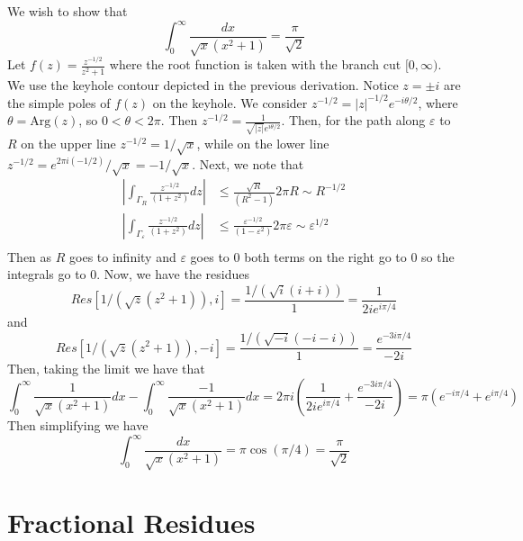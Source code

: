 \begin{example}
    We wish to show that $$\int_0^{\infty}\frac{dx}{\sqrt{x}(x^2+1)} = \frac{\pi}{\sqrt{2}}$$
    Let $f(z) = \frac{z^{-1/2}}{z^2+1}$ where the root function is taken with the branch cut $[0,\infty)$. We use the keyhole contour depicted in the previous derivation. Notice $z = \pm i$ are the simple poles of $f(z)$ on the keyhole. We consider $z^{-1/2} = |z|^{-1/2}e^{-i\theta/2}$, where $\theta = \text{Arg}(z)$, so $0 < \theta < 2\pi$. Then $z^{-1/2} = \frac{1}{\sqrt{|z|}e^{i\theta/2}}$. Then, for the path along $\varepsilon$ to $R$ on the upper line $z^{-1/2} = 1/\sqrt{x}$, while on the lower line $z^{-1/2} = e^{2\pi i(-1/2)}/\sqrt{x} = -1/\sqrt{x}$. Next, we note that \begin{align*}
        \left|\int_{\Gamma_R}\frac{z^{-1/2}}{(1+z^2)}dz\right| &\leq \frac{\sqrt{R}}{(R^2-1)}2\pi R\sim R^{-1/2} \\
        \left|\int_{\Gamma_{\varepsilon}}\frac{z^{-1/2}}{(1+z^2)}dz\right| &\leq \frac{\varepsilon^{-1/2}}{(1-\varepsilon^2)}2\pi \varepsilon\sim \varepsilon^{1/2} \\
    \end{align*}
    Then as $R$ goes to infinity and $\varepsilon$ goes to $0$ both terms on the right go to $0$ so the integrals go to $0$. Now, we have the residues \begin{equation*}
        Res[1/(\sqrt{z}(z^2+1)),i] = \frac{1/(\sqrt{i}(i+i))}{1} = \frac{1}{2ie^{i\pi/4}}
    \end{equation*}
    and \begin{equation*}
        Res[1/(\sqrt{z}(z^2+1)),-i] = \frac{1/(\sqrt{-i}(-i-i))}{1} = \frac{e^{-3i\pi/4}}{-2i} 
    \end{equation*}
    Then, taking the limit we have that \begin{equation*}
        \int_{0}^{\infty}\frac{1}{\sqrt{x}(x^2+1)}dx - \int_0^{\infty}\frac{-1}{\sqrt{x}(x^2+1)}dx = 2\pi i\left(\frac{1}{2ie^{i\pi/4}}+\frac{e^{-3i\pi/4}}{-2i}\right) = \pi \left(e^{-i\pi/4}+e^{i\pi/4}\right)
    \end{equation*}
    Then simplifying we have \begin{equation*}
        \int_0^{\infty}\frac{dx}{\sqrt{x}(x^2+1)} = \pi\cos(\pi/4) = \frac{\pi}{\sqrt{2}}
    \end{equation*}
\end{example}
 

\section{Fractional Residues}

